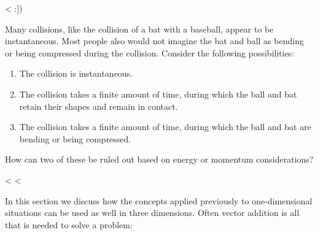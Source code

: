   <%
:])

\startdq

\begin{dq}
Many collisions, like the collision of a bat with a
baseball, appear to be instantaneous. Most people also would
not imagine the bat and ball as bending or being compressed
during the collision. Consider the following possibilities:

\begin{enumerate}
\item The collision is instantaneous.

\item The collision takes a finite amount of time, during
which the ball and bat retain their shapes and remain in contact.

\item The collision takes a finite amount of time, during
which the ball and bat are bending or being compressed.
\end{enumerate}

\noindent How can two of these be ruled out based on energy or
momentum considerations?
\end{dq}

<%
<%

In this section we discuss how the concepts applied
previously to one-dimensional situations can be used as well
in three dimensions. Often vector addition is all that is
needed to solve a problem:

